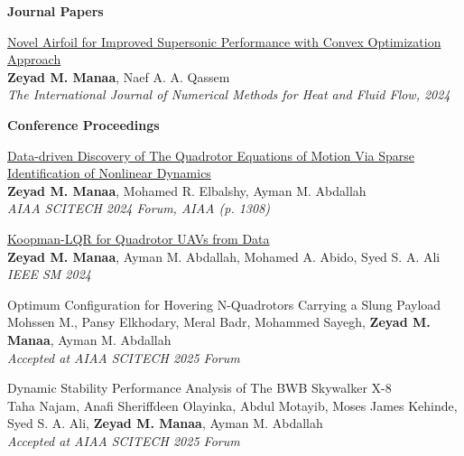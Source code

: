 \textbf{Journal Papers}
\begin{bibenum}
    \item
    \href{https://www.emerald.com/insight/content/doi/10.1108/HFF-06-2024-0433/full/html}{Novel Airfoil for Improved Supersonic Performance with Convex Optimization Approach}\\
    \textbf{Zeyad M. Manaa}, Naef A. A. Qassem\\
    \textit{The International Journal of Numerical Methods for Heat and Fluid Flow, 2024}
\end{bibenum}
\vspace{0.5cm}

\textbf{Conference Proceedings}
\begin{bibenum}
    \item \href{https://arxiv.org/pdf/2305.16500}{{Data-driven Discovery of The Quadrotor Equations of Motion Via Sparse Identification of Nonlinear Dynamics}}\\
    \textbf{Zeyad M. Manaa}, Mohamed R. Elbalshy, Ayman M. Abdallah\\
    \textit{AIAA SCITECH 2024 Forum, AIAA (p. 1308)}

    \item \href{https://arxiv.org/pdf/2406.17973}{Koopman-LQR for Quadrotor UAVs from Data}\\
    \textbf{Zeyad M. Manaa}, Ayman M. Abdallah, Mohamed A. Abido, Syed S. A. Ali\\
    \textit{IEEE SM 2024}

    \item {Optimum Configuration for Hovering N-Quadrotors Carrying a Slung Payload}\\
    Mohssen M., Pansy Elkhodary, Meral Badr, Mohammed Sayegh, \textbf{Zeyad M. Manaa}, Ayman M. Abdallah\\
    \textit{Accepted at AIAA SCITECH 2025 Forum}

    \item {Dynamic Stability Performance Analysis of The BWB Skywalker X-8}\\
    Taha Najam, Anafi Sheriffdeen Olayinka, Abdul Motayib, Moses James Kehinde, Syed S. A. Ali, \textbf{Zeyad M. Manaa}, Ayman M. Abdallah\\
    \textit{Accepted at AIAA SCITECH 2025 Forum}


\end{bibenum}
\vspace{0.5cm}